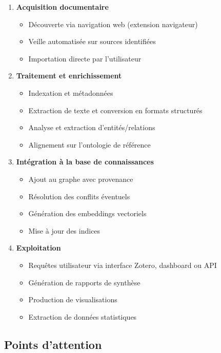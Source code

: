 \documentclass[a4paper,11pt]{report}
\providecommand{\tightlist}{\setlength{\itemsep}{0pt}\setlength{\parskip}{0pt}}
\begin{document}
\begin{enumerate}
\def\labelenumi{\arabic{enumi}.}
\item
  \textbf{Acquisition documentaire}

  \begin{itemize}
  \tightlist
  \item
    Découverte via navigation web (extension navigateur)
  \item
    Veille automatisée sur sources identifiées
  \item
    Importation directe par l'utilisateur
  \end{itemize}
\item
  \textbf{Traitement et enrichissement}

  \begin{itemize}
  \tightlist
  \item
    Indexation et métadonnées
  \item
    Extraction de texte et conversion en formats structurés
  \item
    Analyse et extraction d'entités/relations
  \item
    Alignement sur l'ontologie de référence
  \end{itemize}
\item
  \textbf{Intégration à la base de connaissances}

  \begin{itemize}
  \tightlist
  \item
    Ajout au graphe avec provenance
  \item
    Résolution des conflits éventuels
  \item
    Génération des embeddings vectoriels
  \item
    Mise à jour des indices
  \end{itemize}
\item
  \textbf{Exploitation}

  \begin{itemize}
  \tightlist
  \item
    Requêtes utilisateur via interface Zotero, dashboard ou API
  \item
    Génération de rapports de synthèse
  \item
    Production de visualisations
  \item
    Extraction de données statistiques
  \end{itemize}
\end{enumerate}

\subsection{Points d'attention}\label{points-dattention}
\end{document}
